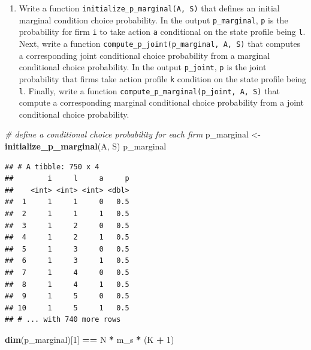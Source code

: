 \documentclass[]{book}
\newenvironment{Shaded}{\begin{snugshade}}{\end{snugshade}}
\newcommand{\KeywordTok}[1]{\textcolor[rgb]{0.13,0.29,0.53}{\textbf{#1}}}
\newcommand{\DecValTok}[1]{\textcolor[rgb]{0.00,0.00,0.81}{#1}}
\newcommand{\StringTok}[1]{\textcolor[rgb]{0.31,0.60,0.02}{#1}}
\newcommand{\CommentTok}[1]{\textcolor[rgb]{0.56,0.35,0.01}{\textit{#1}}}
\newcommand{\OperatorTok}[1]{\textcolor[rgb]{0.81,0.36,0.00}{\textbf{#1}}}
\newcommand{\NormalTok}[1]{#1}
\providecommand{\tightlist}{%
  \setlength{\itemsep}{0pt}\setlength{\parskip}{0pt}}
\begin{document}
\begin{enumerate}
\def\labelenumi{\arabic{enumi}.}
\setcounter{enumi}{4}
\tightlist
\item
  Write a function \texttt{initialize\_p\_marginal(A,\ S)} that defines
  an initial marginal condition choice probability. In the output
  \texttt{p\_marginal}, \texttt{p} is the probability for firm
  \texttt{i} to take action \texttt{a} conditional on the state profile
  being \texttt{l}. Next, write a function
  \texttt{compute\_p\_joint(p\_marginal,\ A,\ S)} that computes a
  corresponding joint conditional choice probability from a marginal
  conditional choice probability. In the output \texttt{p\_joint},
  \texttt{p} is the joint probability that firms take action profile
  \texttt{k} condition on the state profile being \texttt{l}. Finally,
  write a function \texttt{compute\_p\_marginal(p\_joint,\ A,\ S)} that
  compute a corresponding marginal conditional choice probability from a
  joint conditional choice probability.
\end{enumerate}

\begin{Shaded}
\begin{Highlighting}[]
\CommentTok{# define a conditional choice probability for each firm}
\NormalTok{p_marginal <-}\StringTok{ }\KeywordTok{initialize_p_marginal}\NormalTok{(A, S)}
\NormalTok{p_marginal}
\end{Highlighting}
\end{Shaded}

\begin{verbatim}
## # A tibble: 750 x 4
##        i     l     a     p
##    <int> <int> <int> <dbl>
##  1     1     1     0   0.5
##  2     1     1     1   0.5
##  3     1     2     0   0.5
##  4     1     2     1   0.5
##  5     1     3     0   0.5
##  6     1     3     1   0.5
##  7     1     4     0   0.5
##  8     1     4     1   0.5
##  9     1     5     0   0.5
## 10     1     5     1   0.5
## # ... with 740 more rows
\end{verbatim}

\begin{Shaded}
\begin{Highlighting}[]
\KeywordTok{dim}\NormalTok{(p_marginal)[}\DecValTok{1}\NormalTok{] }\OperatorTok{==}\StringTok{ }\NormalTok{N }\OperatorTok{*}\StringTok{ }\NormalTok{m_s }\OperatorTok{*}\StringTok{ }\NormalTok{(K }\OperatorTok{+}\StringTok{ }\DecValTok{1}\NormalTok{)}
\end{Highlighting}
\end{Shaded}
\end{document}
